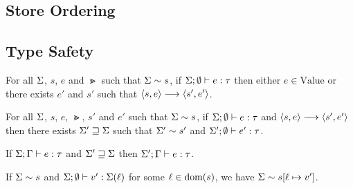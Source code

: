 \documentclass{article}
\begin{document}
\subsection{Store Ordering}

\noindent
    \vspace{-1em}
\begin{prooftree}
\end{prooftree}

\subsection{Type Safety}
\begin{theorem}[Progress]
    For all $\GS$, $s$, $e$ and $\Gt$ such that $\GS\sim s$,
    if $\TTypes{\GS}{\emptyset}{e}{\Gt}$
    then either $e\in\text{Value}$ or there exists $e'$ and $s'$ such that
    $\REval{\tup{s,e}}{\tup{s',e'}}$.
\end{theorem}

\begin{theorem}[Preservation]
    For all $\GS$, $s$, $e$, $\Gt$, $s'$ and $e'$
    such that $\GS\sim s$,
    if $\TTypes{\GS}{\emptyset}{e}{\Gt}$
    and $\REval{\tup{s,e}}{\tup{s',e'}}$ then there exists
    $\GS'\sqsupseteq\GS$ such that $\GS'\sim s'$ and
    $\TTypes{\GS'}{\emptyset}{e'}{\Gt}$.
\end{theorem}

\begin{lemma}
    If $\TTypes{\GS}{\GG}{e}{\Gt}$ and $\GS'\sqsupseteq\GS$
    then $\TTypes{\GS'}{\GG}{e}{\Gt}$.
\end{lemma}

\begin{lemma}
    If $\GS\sim s$ and $\TTypes{\GS}{\emptyset}{v'}{\GS(\TLoc)}$
    for some $\TLoc\in\dom(s)$, we have
    $\GS\sim \update{s}{\TLoc}{v'}$.
\end{lemma}
\end{document}
